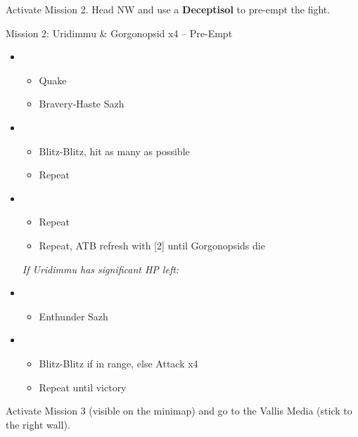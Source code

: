 Activate Mission 2.
Head NW and use a \textbf{Deceptisol} to pre-empt the fight.
\vfill
\begin{battle}{Mission 2: Uridimmu \& Gorgonopsid x4 -- Pre-Empt}
	\begin{itemize}
		\item \third
			\begin{itemize}
				\item Quake
				\item Bravery-Haste Sazh
			\end{itemize}
		\item \second
			\begin{itemize}
				\item Blitz-Blitz, hit as many as possible
				\item Repeat
			\end{itemize}
		\item \first
			\begin{itemize}
				\item Repeat
				\item Repeat, ATB refresh with [2] until Gorgonopsids die
			\end{itemize}
		\textit{If Uridimmu has significant HP left:}
		\item \third
			\begin{itemize}
				\item Enthunder Sazh
			\end{itemize}
		\item \sixth
			\begin{itemize}
				\item Blitz-Blitz if in range, else Attack x4
				\item Repeat until victory
			\end{itemize}
	\end{itemize}
\end{battle}

Activate Mission 3 (visible on the minimap) and go to the Vallis Media (stick to the right wall).